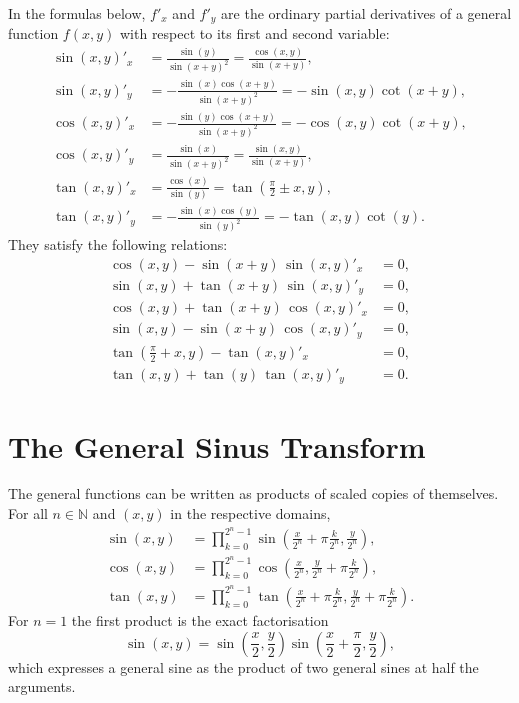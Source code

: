 In the formulas below, $f'_x$ and $f'_y$ are the ordinary partial derivatives of a general function $f(x, y)$ with respect to its first and second variable:
\begin{align}
\sin(x, y)'_x &= \frac{\sin(y)}{\sin(x + y)^2} = \frac{\cos(x, y)}{\sin(x + y)}, \\
\sin(x, y)'_y &= -\frac{\sin(x)\cos(x + y)}{\sin(x + y)^2} = -\sin(x, y)\cot(x + y), \\
\cos(x, y)'_x &= -\frac{\sin(y)\cos(x + y)}{\sin(x + y)^2} = -\cos(x, y)\cot(x + y), \\
\cos(x, y)'_y &= \frac{\sin(x)}{\sin(x + y)^2} = \frac{\sin(x, y)}{\sin(x + y)}, \\
\tan(x, y)'_x &= \frac{\cos(x)}{\sin(y)} = \tan\left(\tfrac{\pi}{2} \pm x, y\right), \\
\tan(x, y)'_y &= -\frac{\sin(x)\cos(y)}{\sin(y)^2} = -\tan(x, y)\cot(y).
\end{align}
They satisfy the following relations:
\begin{align}
\cos(x, y) - \sin(x + y)\,\sin(x, y)'_x &= 0, \\
\sin(x, y) + \tan(x + y)\,\sin(x, y)'_y &= 0, \\
\cos(x, y) + \tan(x + y)\,\cos(x, y)'_x &= 0, \\
\sin(x, y) - \sin(x + y)\,\cos(x, y)'_y &= 0, \\
\tan\left(\tfrac{\pi}{2} + x, y\right) - \tan(x, y)'_x &= 0, \\
\tan(x, y) + \tan(y)\,\tan(x, y)'_y &= 0.
\end{align}

\section{The General Sinus Transform}\label{app:gs-transform}

The general functions can be written as products of scaled copies of themselves. For all $n \in \mathbb{N}$ and $(x, y)$ in the respective domains,
\begin{align}
\sin(x, y) &= \prod_{k=0}^{2^n - 1} \sin\left(\frac{x}{2^n} + \pi\frac{k}{2^n}, \frac{y}{2^n}\right), \label{eq:gs-product-sin} \\
\cos(x, y) &= \prod_{k=0}^{2^n - 1} \cos\left(\frac{x}{2^n}, \frac{y}{2^n} + \pi\frac{k}{2^n}\right), \label{eq:gs-product-cos} \\
\tan(x, y) &= \prod_{k=0}^{2^n - 1} \tan\left(\frac{x}{2^n} + \pi\frac{k}{2^n}, \frac{y}{2^n} + \pi\frac{k}{2^n}\right).
\end{align}
For $n = 1$ the first product is the exact factorisation
\begin{equation}
\sin(x, y) = \sin\left(\frac{x}{2}, \frac{y}{2}\right)\sin\left(\frac{x}{2} + \frac{\pi}{2}, \frac{y}{2}\right),
\end{equation}
which expresses a general sine as the product of two general sines at half the arguments.


